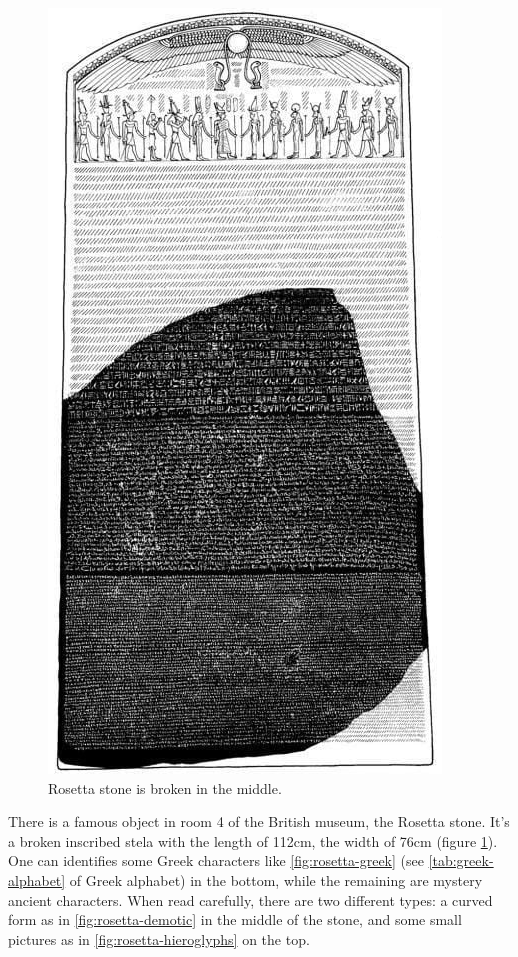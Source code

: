 \documentclass[b5paper]{article}
\begin{document}
\begin{figure}[htbp]
 \centering
 \includegraphics[scale=0.5]{img/Rosetta-stone-recons}
 \caption{Rosetta stone is broken in the middle.}
 \label{fig:rosetta-stone-recons}
\end{figure}

There is a famous object in room 4 of the British museum, the Rosetta stone. It's a broken inscribed stela with the length of 112cm, the width of 76cm (figure \ref{fig:rosetta-stone-recons}). One can identifies some Greek characters like \cref{fig:rosetta-greek} (see \cref{tab:greek-alphabet} of Greek alphabet) in the bottom, while the remaining are mystery ancient characters. When read carefully, there are two different types: a curved form as in \cref{fig:rosetta-demotic} in the middle of the stone, and some small pictures as in \cref{fig:rosetta-hieroglyphs} on the top.
\end{document}
